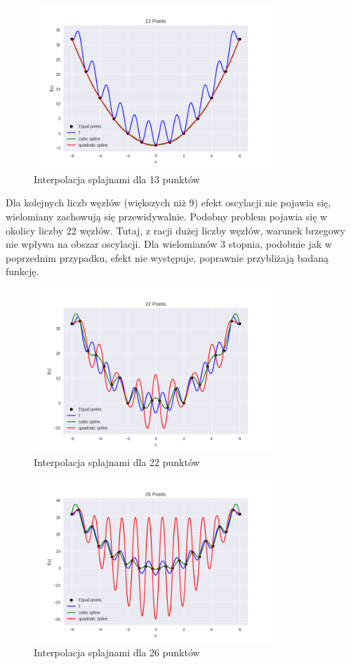 \documentclass{article}
\begin{document}
\begin{figure}[H]
    \centering
    \includegraphics[width=0.8\textwidth]{img/spline_13.png}
    \caption{Interpolacja splajnami dla 13 punktów}
\end{figure}

Dla kolejnych liczb węzłów (większych niż 9) efekt oscylacji nie pojawia się, wielomiany zachowują się przewidywalnie.
Podobny problem pojawia się w okolicy liczby 22 węzłów. Tutaj, z racji dużej liczby węzłów, warunek brzegowy nie wpływa na obszar oscylacji.
Dla wielomianów 3 stopnia, podobnie jak w poprzednim przypadku, efekt nie występuje, poprawnie przybliżają badaną funkcję.

\begin{figure}[H]
    \centering
    \includegraphics[width=0.8\textwidth]{img/spline_22.png}
    \caption{Interpolacja splajnami dla 22 punktów}
\end{figure}

\begin{figure}[H]
    \centering
    \includegraphics[width=0.8\textwidth]{img/spline_26.png}
    \caption{Interpolacja splajnami dla 26 punktów}
\end{figure}
\end{document}
